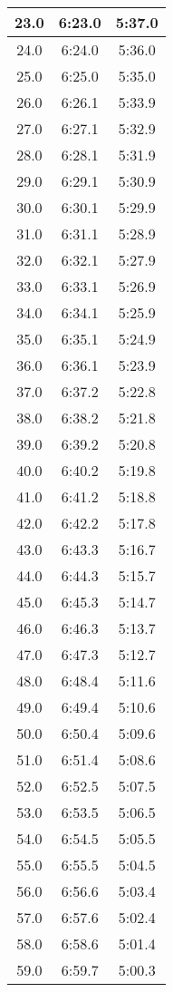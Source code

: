 \begin{footnotesize}
\begin{minipage}{0.25\textwidth}
\begin{tabular}[t]{c|c|c}
	23.0&6:23.0&5:37.0\\\hline
	24.0&6:24.0&5:36.0\\\hline
	25.0&6:25.0&5:35.0\\\hline
	26.0&6:26.1&5:33.9\\\hline
	27.0&6:27.1&5:32.9\\\hline
	28.0&6:28.1&5:31.9\\\hline
	29.0&6:29.1&5:30.9\\\hline
	30.0&6:30.1&5:29.9\\\hline
	31.0&6:31.1&5:28.9\\\hline
	32.0&6:32.1&5:27.9\\\hline
	33.0&6:33.1&5:26.9\\\hline
	34.0&6:34.1&5:25.9\\\hline
	35.0&6:35.1&5:24.9\\\hline
	36.0&6:36.1&5:23.9\\\hline
	37.0&6:37.2&5:22.8\\\hline
	38.0&6:38.2&5:21.8\\\hline
	39.0&6:39.2&5:20.8\\\hline
	40.0&6:40.2&5:19.8\\\hline
	41.0&6:41.2&5:18.8\\\hline
	42.0&6:42.2&5:17.8\\\hline
	43.0&6:43.3&5:16.7\\\hline
	44.0&6:44.3&5:15.7\\\hline
	45.0&6:45.3&5:14.7\\\hline
	46.0&6:46.3&5:13.7\\\hline
	47.0&6:47.3&5:12.7\\\hline
	48.0&6:48.4&5:11.6\\\hline
	49.0&6:49.4&5:10.6\\\hline
	50.0&6:50.4&5:09.6\\\hline
	51.0&6:51.4&5:08.6\\\hline
	52.0&6:52.5&5:07.5\\\hline
	53.0&6:53.5&5:06.5\\\hline
	54.0&6:54.5&5:05.5\\\hline
	55.0&6:55.5&5:04.5\\\hline
	56.0&6:56.6&5:03.4\\\hline
	57.0&6:57.6&5:02.4\\\hline
	58.0&6:58.6&5:01.4\\\hline
	59.0&6:59.7&5:00.3\\\hline
		\end{tabular}\end{minipage}

\end{footnotesize}

